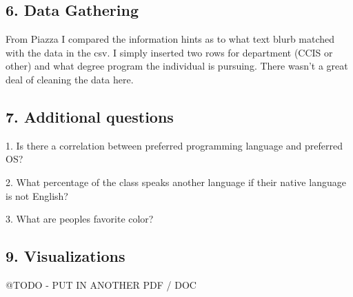 \documentclass{neu_handout}
\begin{document}
\subsection*{6. Data Gathering}
From Piazza I compared the information hints as to what text blurb matched with the data in the csv. I simply inserted two rows for department (CCIS or other) and what degree program the individual is pursuing. There wasn't a great deal of cleaning the data here.

\subsection*{7. Additional questions}
1. Is there a correlation between preferred programming language and preferred OS?

2. What percentage of the class speaks another language if their native language is not English?

3. What are peoples favorite color?

\subsection*{9. Visualizations}
@TODO - PUT IN ANOTHER PDF / DOC
\end{document}
